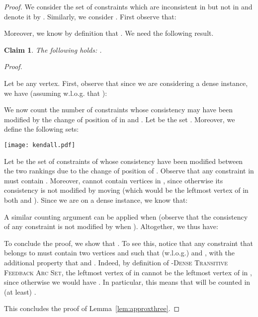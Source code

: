 \documentclass[11pt]{article}
\newtheorem{claim}[theorem]{Claim}
\newenvironment{proofclaim}{
	\noindent \emph{Proof.}
}{\hfill  \\
}
\newcommand{\rFAST}{\textsc{-Dense Transitive Feedback Arc Set}}
\begin{document}
\begin{proof}
We consider the set of constraints which are inconsistent in  but not in  and denote it by . Similarly, we consider . First observe that:


Moreover, we know by definition that . We need the following result. 

\begin{claim}
\label{claim:tau}
	The following holds: . 

\end{claim}

\begin{proofclaim}
	Let  be any vertex. First, observe that since we are considering a dense instance, we have (assuming w.l.o.g. that ): 
	
	
	
	We now count the number of constraints whose consistency may have been modified by the change of position of  in  and . Let  be the set . Moreover, we define the following sets: 
	
\begin{minipage}{0.4 \linewidth}
	
	\end{minipage}
	\begin{minipage}{0.6 \linewidth}
		\centerline{\texttt{[image: kendall.pdf]}}
		\label{fig:kendall}
	\end{minipage}
	\vspace{0.4cm}
	
	Let  be the set of constraints of  whose consistency have been modified between the two rankings due to the change of position of . Observe that any constraint  in  must contain . Moreover, cannot contain  vertices in , since otherwise its consistency is not modified by moving  (which would be the leftmost vertex of  in both  and ). Since we are on a dense instance, we know that: 
	
	
	
	A similar counting argument can be applied when  (observe that the consistency of any constraint is not modified by  when ). Altogether, we thus have: 
	
	
	
	To conclude the proof, we show that . To see this, notice that any constraint that belongs to  must contain two vertices  and  such that (w.l.o.g.)  and , with the additional property that  and . Indeed, by definition of \rFAST{}, the leftmost vertex of  in  cannot be the leftmost vertex of  in , since otherwise we would have . In particular, this means that  will be counted in (at least) . 
\end{proofclaim}

This concludes the proof of Lemma~\ref{lem:approxthree}.
 \end{proof}
\end{document}

